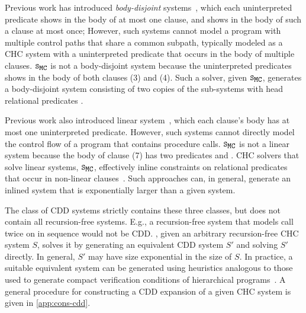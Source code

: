 Previous work has introduced \emph{body-disjoint}
systems~\cite{rummer13a,rummer13b}, 
which each uninterpreted predicate shows in the body of at most one
clause, and shows in the body of such a clause at most once;
%
However, such systems cannot model a program with multiple
control paths that share a common subpath, typically modeled as a CHC
system with a uninterpreted predicate that occurs in the body of multiple clauses.
%
$\mcchc$ is not a body-disjoint system because the uninterpreted
predicates  shows in the body of both clauses (3) and (4).
%
Such a solver, given $\mcchc$, generates a body-disjoint system
consisting of two copies of the sub-systems with head relational
predicates .

Previous work also introduced linear system~\cite{albarghouthi12a}, 
which each clause's body has at most one uninterpreted predicate.
%
However, such systems cannot directly model the control flow of a
program that contains procedure calls.
%
$\mcchc$ is not a linear system because the body of clause (7) has two
predicates  and .
%
CHC solvers that solve linear systems, $\mcchc$, effectively inline constraints on
relational predicates that occur in non-linear clauses~\cite{albarghouthi12b}.
%
Such approaches can, in general, generate an inlined system that is
exponentially larger than a given system.

The class of CDD systems strictly contains these three classes, 
but does not contain all
recursion-free systems.
%
E.g., a recursion-free system that models  
call  twice on  in sequence would not
be CDD.
%
\sys, given an arbitrary recursion-free CHC system $S$,
solves it by generating an equivalent CDD system $S'$ and
solving $S'$ directly.
%
In general, $S'$ may have size exponential in the size of
$S$.
%
In practice, a suitable equivalent system can be generated using
heuristics analogous to those used to generate compact verification
conditions of hierarchical programs~\cite{flanagan01,lal-qadeer15}.
%
A general procedure for constructing a CDD expansion of a given CHC
system is given in \autoref{app:cons-cdd}.

